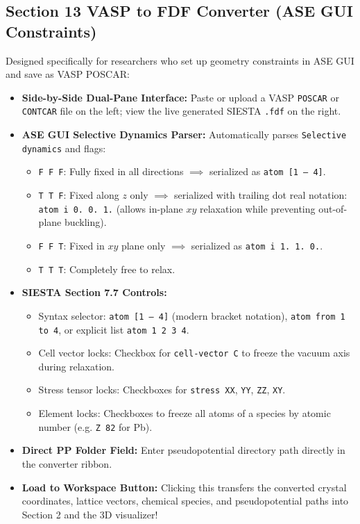 \documentclass[11pt,a4paper]{article}
\begin{document}
\subsection{Section 13 VASP to FDF Converter (ASE GUI Constraints)}
Designed specifically for researchers who set up geometry constraints in ASE GUI and save as VASP POSCAR:
\begin{itemize}[leftmargin=*]
 \item \textbf{Side-by-Side Dual-Pane Interface:} Paste or upload a VASP \texttt{POSCAR} or \texttt{CONTCAR} file on the left; view the live generated SIESTA \texttt{.fdf} on the right.
 \item \textbf{ASE GUI Selective Dynamics Parser:} Automatically parses \texttt{Selective dynamics} and flags:
 \begin{itemize}
 \item \texttt{F F F}: Fully fixed in all directions $\implies$ serialized as \texttt{atom [1 -- 4]}.
 \item \texttt{T T F}: Fixed along $z$ only $\implies$ serialized with trailing dot real notation: \texttt{atom i 0. 0. 1.} (allows in-plane $xy$ relaxation while preventing out-of-plane buckling).
 \item \texttt{F F T}: Fixed in $xy$ plane only $\implies$ serialized as \texttt{atom i 1. 1. 0.}.
 \item \texttt{T T T}: Completely free to relax.
 \end{itemize}
 \item \textbf{SIESTA Section 7.7 Controls:}
 \begin{itemize}
 \item Syntax selector: \texttt{atom [1 -- 4]} (modern bracket notation), \texttt{atom from 1 to 4}, or explicit list \texttt{atom 1 2 3 4}.
 \item Cell vector locks: Checkbox for \texttt{cell-vector C} to freeze the vacuum axis during relaxation.
 \item Stress tensor locks: Checkboxes for \texttt{stress XX}, \texttt{YY}, \texttt{ZZ}, \texttt{XY}.
 \item Element locks: Checkboxes to freeze all atoms of a species by atomic number (e.g. \texttt{Z 82} for Pb).
 \end{itemize}
 \item \textbf{Direct PP Folder Field:} Enter pseudopotential directory path directly in the converter ribbon.
 \item \textbf{Load to Workspace Button:} Clicking this transfers the converted crystal coordinates, lattice vectors, chemical species, and pseudopotential paths into Section 2 and the 3D visualizer!
\end{itemize}
\end{document}
